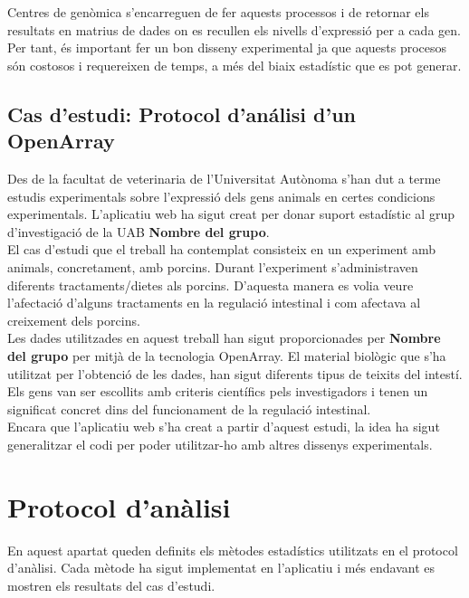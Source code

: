 \documentclass[english]{article}
\begin{document}
Centres de genòmica s'encarreguen de fer aquests processos i de retornar els resultats en matrius de dades on es recullen els nivells d'expressió per a cada gen. Per tant, és important fer un bon disseny experimental ja que aquests procesos són costosos i requereixen de temps, a més del biaix estadístic que es pot generar.


\subsection{Cas d'estudi: Protocol d'análisi d'un OpenArray}
Des de la facultat de veterinaria de l'Universitat Autònoma s'han dut a terme estudis experimentals sobre l'expressió dels gens animals en certes condicions experimentals. L'aplicatiu web ha sigut creat per donar suport estadístic al grup d'investigació de la UAB \textbf{Nombre del grupo}.
\\

El cas d'estudi que el treball ha contemplat consisteix en un experiment amb animals, concretament, amb porcins. Durant l'experiment s'administraven diferents tractaments/dietes als porcins. D'aquesta manera es volia veure l'afectació d'alguns tractaments en la regulació intestinal i com afectava al creixement dels porcins.
\\

Les dades utilitzades en aquest treball han sigut proporcionades per \textbf{Nombre del grupo} per mitjà de la tecnologia OpenArray. El material biològic que s'ha utilitzat per l'obtenció de les dades, han sigut diferents tipus de teixits del intestí. Els gens van ser escollits amb criteris científics pels investigadors i tenen un significat concret dins del funcionament de la regulació intestinal.
\\

Encara que l'aplicatiu web s'ha creat a partir d'aquest estudi, la idea ha sigut generalitzar el codi per poder utilitzar-ho amb altres dissenys experimentals.

\section{Protocol d'anàlisi}
En aquest apartat queden definits els mètodes estadístics utilitzats en el protocol d'anàlisi. Cada mètode ha sigut implementat en l'aplicatiu i més endavant es mostren els resultats del cas d'estudi.
\end{document}
